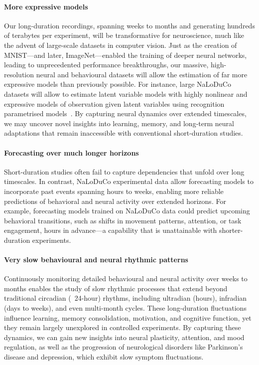 \paragraph{More expressive models}
%
Our long-duration recordings, spanning weeks to months and generating hundreds
of terabytes per experiment, will be transformative for neuroscience, much like
the advent of large-scale datasets in computer vision.  Just as the creation of
MNIST—and later, ImageNet—enabled the training of deeper neural networks,
leading to unprecedented performance breakthroughs, our massive,
high-resolution neural and behavioural datasets will allow the estimation of far
more expressive models than previously possible.
%
For instance, large NaLoDuCo datasets will allow to estimate latent variable
models with highly nonlinear and expressive models of observation given latent
variables using recognition parametrised models~\citep{walkerEtAl23}.
%
By capturing neural dynamics over extended timescales, we may uncover novel
insights into learning, memory, and long-term neural adaptations that remain
inaccessible with conventional short-duration studies.

\paragraph{Forecasting over much longer horizons}
%
Short-duration studies often fail to capture dependencies that unfold over long
timescales. In contrast, NaLoDuCo experimental data allow forecasting models to
incorporate past events spanning hours to weeks, enabling more reliable
predictions of behavioral and neural activity over extended horizons.
%
For example, forecasting models trained on NaLoDuCo data could predict upcoming
behavioral transitions, such as shifts in movement patterns, attention, or task
engagement, hours in advance—a capability that is unattainable with
shorter-duration experiments.

\paragraph{Very slow behavioural and neural rhythmic patterns}
%
Continuously monitoring detailed behavioural and neural activity over weeks to
months enables the study of slow rhythmic processes that extend beyond
traditional circadian (~24-hour) rhythms, including ultradian (hours),
infradian (days to weeks), and even multi-month cycles. These long-duration
fluctuations influence learning, memory consolidation, motivation, and
cognitive function, yet they remain largely unexplored in controlled
experiments. By capturing these dynamics, we can gain new insights into neural
plasticity, attention, and mood regulation, as well as the progression of
neurological disorders like Parkinson’s disease and depression, which exhibit
slow symptom fluctuations.

